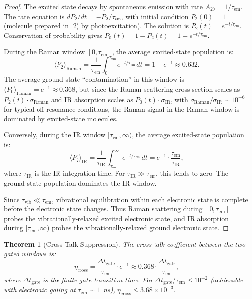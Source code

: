 \documentclass[11pt,a4paper]{article}
\newtheorem{theorem}{Theorem}[section]
\theoremstyle{definition}
\theoremstyle{remark}
\begin{document}
\begin{proof}
The excited state decays by spontaneous emission with rate $A_{20} = 1/\tau_{\mathrm{em}}$. The rate equation is $dP_2/dt = -P_2/\tau_{\mathrm{em}}$, with initial condition $P_2(0) = 1$ (molecule prepared in $|2\rangle$ by photoexcitation). The solution is $P_2(t) = e^{-t/\tau_{\mathrm{em}}}$. Conservation of probability gives $P_0(t) = 1 - P_2(t) = 1 - e^{-t/\tau_{\mathrm{em}}}$.

During the Raman window $[0, \tau_{\mathrm{em}}]$, the average excited-state population is:
\begin{equation}
\langle P_2 \rangle_{\mathrm{Raman}} = \frac{1}{\tau_{\mathrm{em}}} \int_0^{\tau_{\mathrm{em}}} e^{-t/\tau_{\mathrm{em}}} \, dt = 1 - e^{-1} \approx 0.632.
\end{equation}
The average ground-state ``contamination'' in this window is $\langle P_0 \rangle_{\mathrm{Raman}} = e^{-1} \approx 0.368$, but since the Raman scattering cross-section scales as $P_2(t) \cdot \sigma_{\mathrm{Raman}}$ and IR absorption scales as $P_0(t) \cdot \sigma_{\mathrm{IR}}$, with $\sigma_{\mathrm{Raman}} / \sigma_{\mathrm{IR}} \sim 10^{-6}$ for typical off-resonance conditions, the Raman signal in the Raman window is dominated by excited-state molecules.

Conversely, during the IR window $[\tau_{\mathrm{em}}, \infty)$, the average excited-state population is:
\begin{equation}
\langle P_2 \rangle_{\mathrm{IR}} = \frac{1}{\tau_{\mathrm{IR}}} \int_{\tau_{\mathrm{em}}}^{\infty} e^{-t/\tau_{\mathrm{em}}} \, dt = e^{-1} \cdot \frac{\tau_{\mathrm{em}}}{\tau_{\mathrm{IR}}},
\end{equation}
where $\tau_{\mathrm{IR}}$ is the IR integration time. For $\tau_{\mathrm{IR}} \gg \tau_{\mathrm{em}}$, this tends to zero. The ground-state population dominates the IR window.

Since $\tau_{\mathrm{vib}} \ll \tau_{\mathrm{em}}$, vibrational equilibration within each electronic state is complete before the electronic state changes. Thus Raman scattering during $[0, \tau_{\mathrm{em}}]$ probes the vibrationally-relaxed excited electronic state, and IR absorption during $[\tau_{\mathrm{em}}, \infty)$ probes the vibrationally-relaxed ground electronic state.
\end{proof}

\begin{theorem}[Cross-Talk Suppression]
\label{thm:crosstalk}
The cross-talk coefficient between the two gated windows is:
\begin{equation}
\eta_{\mathrm{cross}} = \frac{\Delta t_{\mathrm{gate}}}{\tau_{\mathrm{em}}} \cdot e^{-1} \approx 0.368 \cdot \frac{\Delta t_{\mathrm{gate}}}{\tau_{\mathrm{em}}},
\end{equation}
where $\Delta t_{\mathrm{gate}}$ is the finite gate transition time. For $\Delta t_{\mathrm{gate}} / \tau_{\mathrm{em}} \leq 10^{-2}$ (achievable with electronic gating at $\tau_{\mathrm{em}} \sim 1$~ns), $\eta_{\mathrm{cross}} \leq 3.68 \times 10^{-3}$.
\end{theorem}
\end{document}
